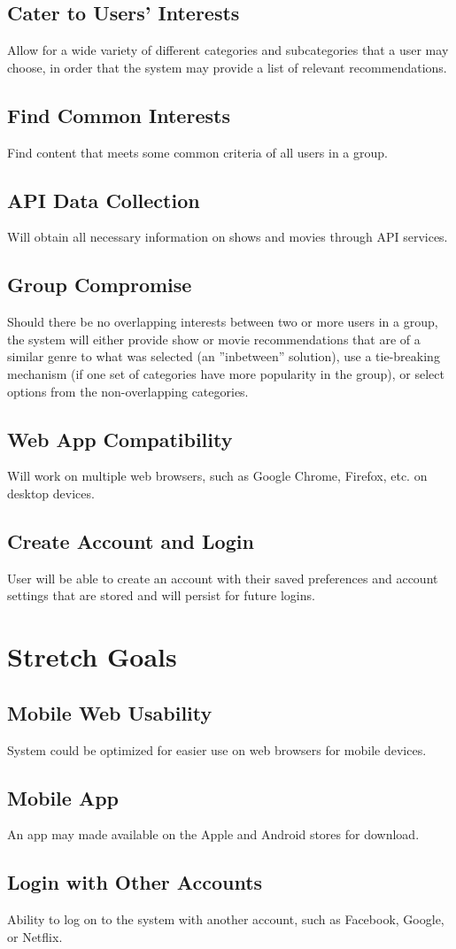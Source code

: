 \documentclass{article}
\begin{document}
\subsection{Cater to Users' Interests}
Allow for a wide variety of different categories and subcategories that a user may choose, in order that the system may provide a list of relevant recommendations.

\subsection{Find Common Interests}
Find content that meets some common criteria of all users in a group.

\subsection{API Data Collection}
Will obtain all necessary information on shows and movies through API services.

\subsection{Group Compromise}
Should there be no overlapping interests between two or more users in a group, the system will either provide show or movie recommendations that are of a similar 
genre to what was selected (an ”inbetween” solution), use a tie-breaking mechanism (if one set of categories have more popularity in the group), or select options 
from the non-overlapping categories.

\subsection{Web App Compatibility}
Will work on multiple web browsers, such as Google Chrome, Firefox, etc. on desktop devices.

\subsection{Create Account and Login}
User will be able to create an account with their saved preferences and account settings that are stored and will persist for future logins.

\section{Stretch Goals}

\subsection{Mobile Web Usability}
System could be optimized for easier use on web browsers for mobile devices.

\subsection{Mobile App}
An app may made available on the Apple and Android stores for download.

\subsection{Login with Other Accounts}
Ability to log on to the system with another account, such as Facebook, Google, or Netflix.
\end{document}
